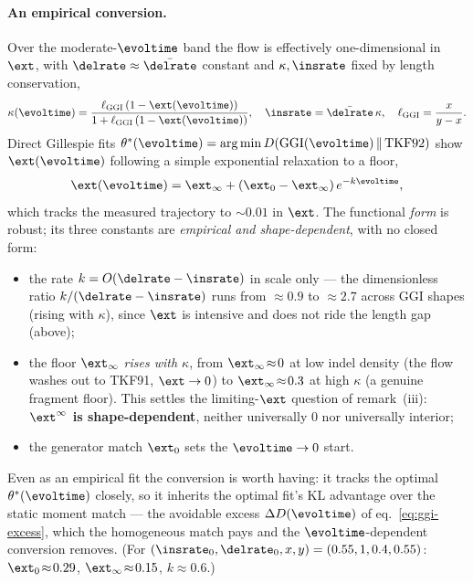 \paragraph{An empirical conversion.}
Over the moderate-$\evoltime$ band the flow is effectively one-dimensional in
$\ext$, with $\delrate\approx\bar\delrate$ constant and $\kappa,\insrate$ fixed by
length conservation,
\begin{equation}
\label{eq:ggi-conserve}
\kappa(\evoltime)=\frac{\ell_\ggi\,(1-\ext(\evoltime))}{1+\ell_\ggi\,(1-\ext(\evoltime))},
\quad \insrate=\bar\delrate\,\kappa,\quad \ell_\ggi=\frac{x}{y-x}.
\end{equation}
Direct Gillespie fits $\theta^\ast(\evoltime)=\arg\min
\dkl{\mathrm{GGI}(\evoltime)}{\mathrm{TKF92}}$ show $\ext(\evoltime)$ following a
simple exponential relaxation to a floor,
\begin{equation}
\label{eq:ggi-closedform}
\ext(\evoltime)=\ext_\infty+(\ext_0-\ext_\infty)\,e^{-k\evoltime},
\end{equation}
which tracks the measured trajectory to $\sim0.01$ in $\ext$.  The functional
\emph{form} is robust; its three constants are \emph{empirical and
shape-dependent}, with no closed form:
\begin{itemize}
\item the rate $k=O(\delrate-\insrate)$ in scale only --- the dimensionless ratio
$k/(\delrate-\insrate)$ runs from $\approx0.9$ to $\approx2.7$ across GGI shapes
(rising with $\kappa$), since $\ext$ is intensive and does not ride the length
gap (above);
\item the floor $\ext_\infty$ \emph{rises with $\kappa$}, from $\ext_\infty\!\approx\!0$
at low indel density (the flow washes out to TKF91, $\ext\to0$) to
$\ext_\infty\!\approx\!0.3$ at high $\kappa$ (a genuine fragment floor).  This
settles the limiting-$\ext$ question of remark~(iii): \textbf{$\ext^\infty$ is
shape-dependent}, neither universally $0$ nor universally interior;
\item the generator match $\ext_0$ sets the $\evoltime\to0$ start.
\end{itemize}
Even as an empirical fit the conversion is worth having: it tracks the optimal
$\theta^\ast(\evoltime)$ closely, so it inherits the optimal fit's KL advantage
over the static moment match --- the avoidable excess $\Delta D(\evoltime)$ of
eq.~\eqref{eq:ggi-excess}, which the homogeneous match pays and the
$\evoltime$-dependent conversion removes.  (For
$(\insrate_0,\delrate_0,x,y)=(0.55,1,0.4,0.55)$: $\ext_0\!\approx\!0.29$,
$\ext_\infty\!\approx\!0.15$, $k\!\approx\!0.6$.)

